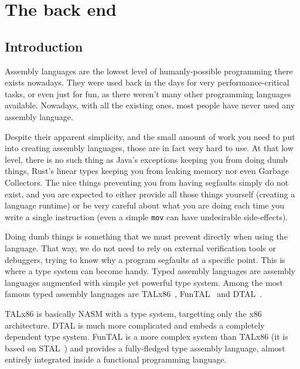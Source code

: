 \begingroup
{}



\part{The back end}\label{part:nstar}


\chapter{Introduction}\label{chap:nstar-abstract}

Assembly languages are the lowest level of humanly-possible programming there exists nowadays. They were used back in the days for very performance-critical tasks, or even just for fun, as there weren't many other programming languages available. Nowadays, with all the existing ones, most people have never used any assembly language.

Despite their apparent simplicity, and the small amount of work you need to put into creating assembly languages, those are in fact very hard to use. At that low level, there is no such thing as Java's exceptions keeping you from doing dumb things, Rust's linear types keeping you from leaking memory nor even Garbage Collectors. The nice things preventing you from having segfaults simply do not exist, and you are expected to either provide all those things yourself (creating a language runtime) or be very careful about what you are doing each time you write a single instruction (even a simple \texttt{mov} can have undesirable side-effects).

Doing dumb things is something that we must prevent directly when using the language. That way, we do not need to rely on external verification tools or debuggers, trying to know why a program segfaults at a specific point.
This is where a type system can become handy. Typed assembly languages are assembly languages augmented with simple yet powerful type system. Among the most famous typed assembly languages are TALx86~\cite{TALx86}, FunTAL~\cite{FunTAL} and DTAL~\cite{DTAL}.

TALx86 is basically NASM with a type system, targetting only the x86 architecture. DTAL is much more complicated and embeds a completely dependent type system. FunTAL is a more complex system than TALx86 (it is based on STAL~\cite{STAL}) and provides a fully-fledged type assembly language, almost entirely integrated inside a functional programming language.

